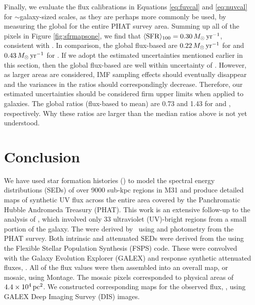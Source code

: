 \documentclass[iop, tighten]{emulateapj}
\begin{document}
Finally, we evaluate the flux calibrations in Equations \ref{eq:fuvcal} and
\ref{eq:nuvcal} for $\sim$galaxy-sized scales, as they are perhaps more
commonly be used, by measuring the global \sfr{} for the entire PHAT survey
area. Summing up all of the pixels in Figure \ref{fig:sfrmapsone}, we find that
$\langle\mathrm{SFR}\rangle_{100}=0.30\,M_\odot\,\mathrm{yr}^{-1}$, consistent with \citet{Lewis:2014}. In
comparison, the global flux-based  are $0.22\,M_\odot\,\mathrm{yr}^{-1}$ for \fuv{}
and $0.43\,M_\odot\,\mathrm{yr}^{-1}$ for \nuv{}. If we adopt the estimated uncertainties
mentioned earlier in this section, then the global flux-based  are well
within uncertainty of \sfroneh{}. However, as larger areas are considered, IMF
sampling effects should eventually disappear and the variances in the \sfr{}
ratios should correspondingly decrease. Therefore, our estimated uncertainties
should be considered firm upper limits when applied to galaxies. The global
\sfr{} ratios (flux-based to mean) are 0.73 and 1.43 for \fuv{} and \nuv{},
respectively. Why these ratios are larger than the median ratios above is not
yet understood.





\section{Conclusion}\label{conclusion}

We have used star formation histories () to model the spectral energy
distributions (SEDs) of over 9000 sub-kpc regions in M31 and produce detailed
maps of synthetic UV flux across the entire area covered by the Panchromatic
Hubble Andromeda Treasury (PHAT). This work is an extensive follow-up to the
analysis of \citet{Simones:2014}, which involved only 33 ultraviolet
(UV)-bright regions from a small portion of the galaxy. The  were
derived by \citet{Lewis:2014}\ using \acsb{} and \acsi{} photometry from the
PHAT survey. Both intrinsic and attenuated SEDs were derived from the 
using the Flexible Stellar Population Synthesis (FSPS) code. These were
convolved with the Galaxy Evolution Explorer (GALEX) \fuv{} and \nuv{} response
synthetic attenuated fluxes, \fxsfh{}. All of the flux values were then
assembled into an overall map, or mosaic, using Montage. The mosaic pixels
corresponded to physical areas of $4.4\times 10^4\,\mathrm{pc}^2$. We constructed
corresponding maps for the observed flux, \fxobs{}, using GALEX Deep Imaging
Survey (DIS) images.
\end{document}
